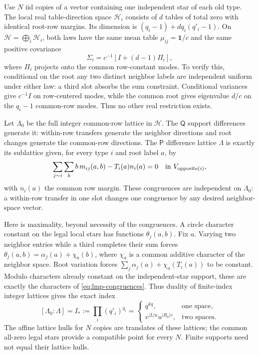Use $N$ iid copies of a vector containing one independent star of
each old type. The local real table-direction space $\mathcal H_i$
consists of $d$ tables of total zero with identical root-row margins.
Its dimension is $(q_i-1)+dq_i(q'_i-1)$. On
$\mathcal H=\bigoplus_i\mathcal H_i$, both laws have the same mean
table $\mu_{ij}=\mathbf1/c$ and the same positive covariance
\begin{equation}\label{eq:lmp-covariance}
 \Sigma_i=c^{-1}[I+(d-1)\Pi_i],
\end{equation}
where $\Pi_i$ projects onto the common row-constant modes. To verify
this, conditional on the root any two distinct neighbor labels are
independent uniform under either law: a third slot absorbs the sum
constraint. Conditional variances give $c^{-1}I$ on row-centered
modes, while the common root gives eigenvalue $d/c$ on the
$q_i-1$ common-row modes. Thus no other real restriction exists.

Let $\Lambda_0$ be the full integer common-row lattice in
$\mathcal H$. The $\mathsf Q$ support differences generate it:
within-row transfers generate the neighbor directions and root
changes generate the common-row directions. The $\mathsf P$
difference lattice $\Lambda$ is exactly its sublattice given, for
every type $i$ and root label $a$, by
\begin{equation}\label{eq:lmp-congruences}
 \sum_{j\sim i}\sum_b b\,m_{ij}(a,b)-T_i(a)n_i(a)=0
          \quad\hbox{in }V_{\mathrm{opposite}(i)},
\end{equation}
with $n_i(a)$ the common row margin. These congruences are independent
on $\Lambda_0$: a within-row transfer in one slot changes one
congruence by any desired neighbor-space vector.

Here is maximality, beyond necessity of the congruences. A circle
character constant on the legal local stars has functions
$\theta_j(a,b)$. Fix $a$. Varying two neighbor entries while a third
completes their sum forces
$\theta_j(a,b)=\alpha_j(a)+\chi_a(b)$, where $\chi_a$ is a common
additive character of the neighbor space. Root variation forces
$\sum_j\alpha_j(a)+\chi_a(T_i(a))$ to be constant. Modulo characters
already constant on the independent-star support, these are exactly
the characters of \eqref{eq:lmp-congruences}. Thus duality of
finite-index integer lattices gives the exact index
\begin{equation}\label{eq:lmp-index}
 [\Lambda_0:\Lambda]=I_*:=\prod_i(q'_i)^{q_i}
 =\begin{cases}
 q^{kq},&\text{one space},\\
 v^{|L|u}u^{|R_0|v},&\text{two spaces}.
 \end{cases}
\end{equation}
The affine lattice hulls for $N$ copies are translates of these
lattices; the common all-zero legal stars provide a compatible point
for every $N$. Finite supports need not equal their lattice hulls.

